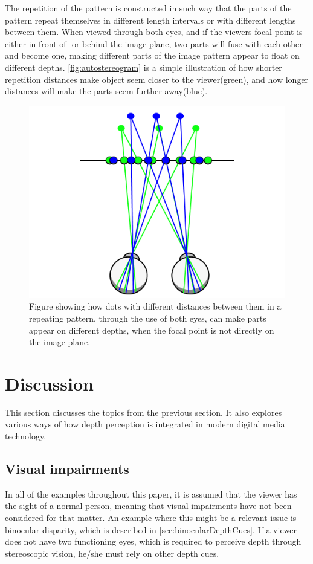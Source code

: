The repetition of the pattern is constructed in such way that the parts of the pattern repeat themselves in different length intervals or with different lengths between them. When viewed through both eyes, and if the viewers focal point is either in front of- or behind the image plane, two parts will fuse with each other and become one, making different parts of the image pattern appear to float on different depths\citep{autostereogramNguyen}. \autoref{fig:autostereogram} is a simple illustration of how shorter repetition distances make object seem closer to the viewer(green), and how longer distances will make the parts seem further away(blue). 

\begin{figure}[H]
	\centering
	\includegraphics[width=0.8\linewidth]{figure/Analysis/autoStereogram.png}
	\caption{Figure showing how dots with different distances between them in a repeating pattern, through the use of both eyes, can make parts appear on different depths, when the focal point is not directly on the image plane.}
	\label{fig:autostereogram}
\end{figure}

\section{Discussion}
This section discusses the topics from the previous section. It also explores various ways of how depth perception is integrated in modern digital media technology.

	\subsection{Visual impairments}
	In all of the examples throughout this paper, it is assumed that the viewer has the sight of a normal person, meaning that visual impairments have not been considered for that matter. An example where this might be a relevant issue is binocular disparity, which is described in \autoref{sec:binocularDepthCues}. If a viewer does not have two functioning eyes, which is required to perceive depth through stereoscopic vision, he/she must rely on other depth cues.

